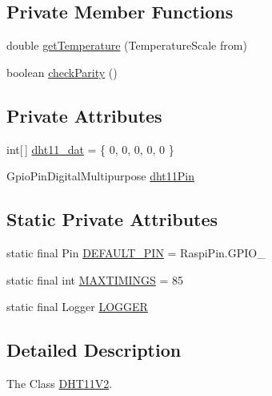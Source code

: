 \subsection*{Private Member Functions}
\begin{DoxyCompactItemize}
\item 
double \hyperlink{classcom_1_1libsensorj_1_1concretesensor_1_1DHT11V2_a4efa0044c366379af59e24b9570b3ddf}{get\+Temperature} (Temperature\+Scale from)
\item 
boolean \hyperlink{classcom_1_1libsensorj_1_1concretesensor_1_1DHT11V2_a250ebf2e29c3e9c84c840d6f6afc1c00}{check\+Parity} ()
\end{DoxyCompactItemize}
\subsection*{Private Attributes}
\begin{DoxyCompactItemize}
\item 
int\mbox{[}$\,$\mbox{]} \hyperlink{classcom_1_1libsensorj_1_1concretesensor_1_1DHT11V2_ae61a33360dfe4106613bf970ecb6d96c}{dht11\+\_\+dat} = \{ 0, 0, 0, 0, 0 \}
\item 
Gpio\+Pin\+Digital\+Multipurpose \hyperlink{classcom_1_1libsensorj_1_1concretesensor_1_1DHT11V2_a04cca3ab141bcf0089fd6a7338a5dabe}{dht11\+Pin}
\end{DoxyCompactItemize}
\subsection*{Static Private Attributes}
\begin{DoxyCompactItemize}
\item 
static final Pin \hyperlink{classcom_1_1libsensorj_1_1concretesensor_1_1DHT11V2_a10e251a19e426166bb913323eee6243b}{D\+E\+F\+A\+U\+L\+T\+\_\+\+P\+I\+N} = Raspi\+Pin.\+G\+P\+I\+O\+\_
\item 
static final int \hyperlink{classcom_1_1libsensorj_1_1concretesensor_1_1DHT11V2_ad64749b474c180fea185aecd512eb656}{M\+A\+X\+T\+I\+M\+I\+N\+G\+S} = 85
\item 
static final Logger \hyperlink{classcom_1_1libsensorj_1_1concretesensor_1_1DHT11V2_acef19b315279adf9b39a4407487d401e}{L\+O\+G\+G\+E\+R}
\end{DoxyCompactItemize}


\subsection{Detailed Description}
The Class \hyperlink{classcom_1_1libsensorj_1_1concretesensor_1_1DHT11V2}{D\+H\+T11\+V2}. 

